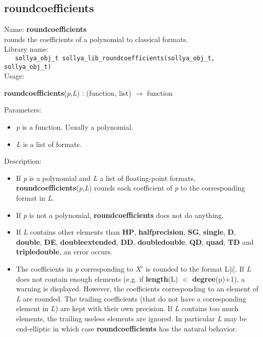 \subsection{roundcoefficients}
\label{labroundcoefficients}
\noindent Name: \textbf{roundcoefficients}\\
\phantom{aaa}rounds the coefficients of a polynomial to classical formats.\\[0.2cm]
\noindent Library name:\\
\verb|   sollya_obj_t sollya_lib_roundcoefficients(sollya_obj_t, sollya_obj_t)|\\[0.2cm]
\noindent Usage: 
\begin{center}
\textbf{roundcoefficients}(\emph{p},\emph{L}) : (\textsf{function}, \textsf{list}) $\rightarrow$ \textsf{function}\\
\end{center}
Parameters: 
\begin{itemize}
\item \emph{p} is a function. Usually a polynomial.
\item \emph{L} is a list of formats.
\end{itemize}
\noindent Description: \begin{itemize}

\item If \emph{p} is a polynomial and \emph{L} a list of floating-point formats, 
   \textbf{roundcoefficients}(\emph{p},\emph{L}) rounds each coefficient of \emph{p} to the corresponding format
   in \emph{L}.

\item If \emph{p} is not a polynomial, \textbf{roundcoefficients} does not do anything.

\item If \emph{L} contains other elements than \textbf{HP}, \textbf{halfprecision}, \textbf{SG}, \textbf{single}, \textbf{D}, \textbf{double}, 
   \textbf{DE}, \textbf{doubleextended}, \textbf{DD}, \textbf{doubledouble}, \textbf{QD}, \textbf{quad}, \textbf{TD} and \textbf{tripledouble},
   an error occurs.

\item The coefficients in \emph{p} corresponding to $X^i$ is rounded to the 
   format L[i]. If \emph{L} does not contain enough elements
   (e.g. if \textbf{length}(L) $<$ \textbf{degree}(p)+1), a warning is displayed. However, the
   coefficients corresponding to an element of \emph{L} are rounded. The trailing 
   coefficients (that do not have a corresponding element in \emph{L}) are kept with
   their own precision.
   If \emph{L} contains too much elements, the trailing useless elements are ignored.
   In particular \emph{L} may be end-elliptic in which case \textbf{roundcoefficients} has the 
   natural behavior.
\end{itemize}
